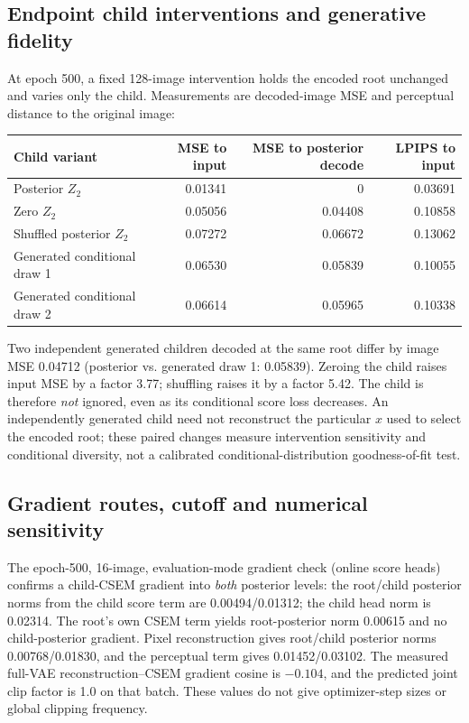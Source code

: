 \documentclass[10pt]{article}
\begin{document}
\subsection{Endpoint child interventions and generative fidelity}
At epoch 500, a fixed 128-image intervention holds the encoded root unchanged and varies only the child. Measurements are decoded-image MSE and perceptual distance to the original image:
\begin{center}
\begin{tabular}{@{}lrrr@{}}
\toprule
Child variant & MSE to input & MSE to posterior decode & LPIPS to input\\
\midrule
Posterior $Z_2$ & 0.01341 & 0 & 0.03691\\
Zero $Z_2$ & 0.05056 & 0.04408 & 0.10858\\
Shuffled posterior $Z_2$ & 0.07272 & 0.06672 & 0.13062\\
Generated conditional draw 1 & 0.06530 & 0.05839 & 0.10055\\
Generated conditional draw 2 & 0.06614 & 0.05965 & 0.10338\\
\bottomrule
\end{tabular}
\end{center}
Two independent generated children decoded at the same root differ by image MSE 0.04712 (posterior vs. generated draw 1: 0.05839). Zeroing the child raises input MSE by a factor 3.77; shuffling raises it by a factor 5.42. The child is therefore \emph{not} ignored, even as its conditional score loss decreases. An independently generated child need not reconstruct the particular $x$ used to select the encoded root; these paired changes measure intervention sensitivity and conditional diversity, not a calibrated conditional-distribution goodness-of-fit test.

\subsection{Gradient routes, cutoff and numerical sensitivity}
The epoch-500, 16-image, evaluation-mode gradient check (online score heads) confirms a child-CSEM gradient into \emph{both} posterior levels: the root/child posterior norms from the child score term are 0.00494/0.01312; the child head norm is 0.02314. The root's own CSEM term yields root-posterior norm 0.00615 and no child-posterior gradient. Pixel reconstruction gives root/child posterior norms 0.00768/0.01830, and the perceptual term gives 0.01452/0.03102. The measured full-VAE reconstruction--CSEM gradient cosine is $-0.104$, and the predicted joint clip factor is 1.0 on that batch. These values do not give optimizer-step sizes or global clipping frequency.
\end{document}
